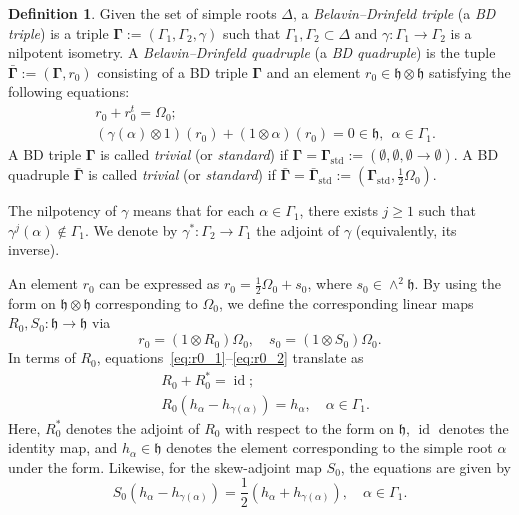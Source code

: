 \documentclass[11pt]{article}
\newcommand{\bbg}{\bar{\mathbf{\Gamma}}}
\newcommand{\bg}{\mathbf{\Gamma}}
\newcommand{\std}{\mathrm{std}}
\DeclareMathOperator{\id}{id}
\theoremstyle{definition}\newtheorem{definition}[theorem]{Definition}
\theoremstyle{definition}\newtheorem{remark}[theorem]{Remark}
\theoremstyle{remark}
\numberwithin{equation}{section}
\begin{document}
\begin{definition}
    Given the set of simple roots $\Delta$, a \emph{Belavin--Drinfeld triple} (a \emph{BD triple}) is a triple $\bg:=(\Gamma_1,\Gamma_2,\gamma)$ such that $\Gamma_1,\Gamma_2\subset \Delta$ and $\gamma : \Gamma_1 \rightarrow \Gamma_2$ is a nilpotent isometry. A \emph{Belavin--Drinfeld quadruple} (a \emph{BD quadruple}) is the tuple $\bbg:=(\bg,r_0)$ consisting of a BD triple $\bg$ and an element $r_0 \in \mathfrak{h}\otimes \mathfrak{h}$ satisfying the following equations:
    \begin{align}
        &r_0 + r_0^t = \Omega_{0}; \label{eq:r0_1} \\
        &(\gamma(\alpha) \otimes 1)(r_0) + (1 \otimes \alpha) (r_0) = 0 \in \mathfrak{h}, \ \ \alpha \in \Gamma_1.\label{eq:r0_2}
    \end{align}
    A BD triple $\bg$ is called \emph{trivial} (or \emph{standard}) if $\bg = \bg_{\std}:=(\emptyset,\emptyset,\emptyset \rightarrow \emptyset)$. A BD quadruple $\bbg$ is called \emph{trivial} (or \emph{standard}) if $\bbg = \bbg_{\std}:=(\bg_{\std},\frac{1}{2}\Omega_0)$.
\end{definition}
The nilpotency of $\gamma$ means that for each $\alpha \in \Gamma_1$, there exists $j \geq 1$ such that $\gamma^j(\alpha) \notin \Gamma_1$. We denote by $\gamma^* : \Gamma_2 \rightarrow \Gamma_1$ the adjoint of $\gamma$ (equivalently, its inverse). 

An element $r_0$ can be expressed as $r_0 = \frac{1}{2}\Omega_0 + s_0$, where $s_0\in \wedge^2 \mathfrak{h}$. By using the form on $\mathfrak{h}\otimes \mathfrak{h}$ corresponding to $\Omega_0$, we define the corresponding linear maps $R_0,S_0 : \mathfrak{h}\rightarrow \mathfrak{h}$ via 
\begin{equation*}
    r_0 = (1\otimes R_0)\Omega_0, \quad s_0 = (1\otimes S_0)\Omega_0.
\end{equation*}
In terms of $R_0$, equations~\eqref{eq:r0_1}--\eqref{eq:r0_2} translate as
\begin{align*}
    &R_0 + R_0^* = \id;\\
    &R_0(h_{\alpha}-h_{\gamma(\alpha)}) = h_{\alpha}, \quad \alpha \in \Gamma_1.
\end{align*}
Here, $R_0^*$ denotes the adjoint of $R_0$ with respect to the form on $\mathfrak{h}$, $\id$ denotes the identity map, and $h_{\alpha} \in \mathfrak{h}$ denotes the element corresponding to the simple root $\alpha$ under the form. Likewise, for the skew-adjoint map $S_0$, the equations are given by
\begin{equation}\label{eq:S0}
    S_0(h_{\alpha}-h_{\gamma(\alpha)}) = \frac{1}{2}(h_{\alpha} + h_{\gamma(\alpha)}), \quad \alpha \in \Gamma_1.
\end{equation}
\end{document}

